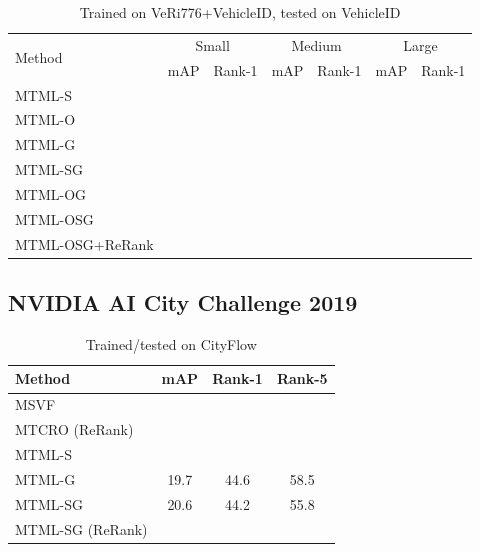 \documentclass[10pt,twocolumn,letterpaper]{article}
\begin{document}
\begin{table}
  \centering
  \setlength{\tabcolsep}{0.01cm}
  \begin{tabular}{l || c | c || c | c || c | c }
    \hline
    \multirow{2}{*}{Method} & \multicolumn{2}{c}{Small} & \multicolumn{2}{c}{Medium} &\multicolumn{2}{c}{Large} \\
    \cline{2-7}
    & mAP & Rank-1 & mAP & Rank-1 & mAP & Rank-1 \\
    \hline
    MTML-S & \\
    MTML-O & \\
    MTML-G & \\
    MTML-SG & \\
    MTML-OG & \\
    MTML-OSG & \\
    MTML-OSG+ReRank & \\
    \hline
  \end{tabular}
  \caption{Trained on VeRi776+VehicleID, tested on VehicleID}
  \label{T:benchmark_results_vehicleid}
\end{table}

\subsection{NVIDIA AI City Challenge 2019}

\begin{table}[ht]
  \centering
  \begin{tabular}{l || c | c | c }
    \hline
    Method & mAP & Rank-1 & Rank-5 \\
    \hline
    MSVF \cite{kanaci2018vehicle} & & & \\
    MTCRO (ReRank) \cite{xu2018framework} &  & & \\
    \hline
    MTML-S &  & & \\
    MTML-G & 19.7 & 44.6 & 58.5 \\
    \hline
    MTML-SG & 20.6 & 44.2 & 55.8 \\
    \hline
    MTML-SG (ReRank) &  & & \\
    \hline
  \end{tabular}
  \caption{Trained/tested on CityFlow}
  \label{T:cityflow_results}
\end{table}
\end{document}
